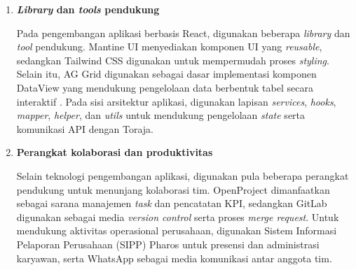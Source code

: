 \begin{enumerate}
\begin{enumerate}[noitemsep, topsep=0pt]
                  \item \textbf{Toraja (Django/Python)}

                        Toraja merupakan \textit{framework} internal perusahaan yang dibangun
                        menggunakan Django dan Python. Django sendiri merupakan \textit{framework} web
                        tingkat tinggi yang menerapkan prinsip pengembangan cepat dan desain yang
                        terstruktur \cite{django_docs}. Pada periode pertengahan April 2026, Toraja
                        digunakan untuk membuat dan menyesuaikan \textit{endpoint} API yang
                        menghubungkan antarmuka React dengan database seiring dengan berkembangnya
                        peran menjadi \textit{Full-Stack Developer}.
            \end{enumerate}

      \item \textbf{\textit{Library} dan \textit{tools} pendukung}

            Pada pengembangan aplikasi berbasis React, digunakan beberapa \textit{library}
            dan \textit{tool} pendukung. Mantine UI menyediakan komponen UI yang
            \textit{reusable}, sedangkan Tailwind CSS digunakan untuk mempermudah proses
            \textit{styling}. Selain itu, AG Grid digunakan sebagai dasar implementasi
            komponen DataView yang mendukung pengelolaan data berbentuk tabel secara
            interaktif \cite{aggrid_docs}. Pada sisi arsitektur aplikasi, digunakan lapisan
            \textit{services}, \textit{hooks}, \textit{mapper}, \textit{helper}, dan
            \textit{utils} untuk mendukung pengelolaan \textit{state} serta komunikasi API
            dengan Toraja.

      \item \textbf{Perangkat kolaborasi dan produktivitas}

            Selain teknologi pengembangan aplikasi, digunakan pula beberapa perangkat
            pendukung untuk menunjang kolaborasi tim. OpenProject dimanfaatkan sebagai
            sarana manajemen \textit{task} dan pencatatan KPI, sedangkan GitLab digunakan
            sebagai media \textit{version control} serta proses \textit{merge request}.
            Untuk mendukung aktivitas operasional perusahaan, digunakan Sistem Informasi
            Pelaporan Perusahaan (SIPP) Pharos untuk presensi dan administrasi karyawan,
            serta WhatsApp sebagai media komunikasi antar anggota tim.
\end{enumerate}
